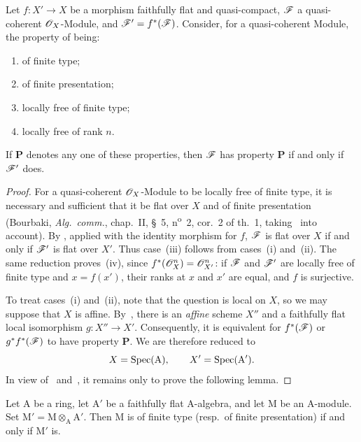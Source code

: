 \begin{proposition}[2.5.2]
\label{IV.2.5.2}
Let $f:X'\to X$ be a morphism faithfully flat and quasi-compact,
$\mathscr{F}$ a quasi-coherent $\mathscr{O}_X$-Module, and
$\mathscr{F}'=f^*(\mathscr{F})$. Consider, for a quasi-coherent Module, the property
of being:
\begin{enumerate}
  \item[\textup{(i)}] of finite type;
  \item[\textup{(ii)}] of finite presentation;
  \item[\textup{(iii)}] locally free of finite type;
  \item[\textup{(iv)}] locally free of rank $n$.
\end{enumerate}
If $\boldsymbol{P}$ denotes any one of these properties, then $\mathscr{F}$ has
property $\boldsymbol{P}$ if and only if $\mathscr{F}'$ does.
\end{proposition}

\begin{proof}
For a quasi-coherent $\mathscr{O}_X$-Module to be locally free of finite type,
it is necessary and sufficient that it be flat over $X$ and of finite
presentation (Bourbaki, \emph{Alg.\ comm.}, chap.~II, \S~5, n\textsuperscript{o}~2,
cor.~2 of th.~1, taking~ into account). By
, applied with the identity morphism for $f$, $\mathscr{F}$ is
flat over $X$ if and only if $\mathscr{F}'$ is flat over $X'$. Thus case~(iii)
follows from cases~(i) and~(ii). The same reduction proves~(iv), since
$f^*(\mathscr{O}_X^n)=\mathscr{O}_{X'}^n$: if $\mathscr{F}$ and $\mathscr{F}'$ are locally
free of finite type and $x=f(x')$, their ranks at $x$ and $x'$ are equal,
and $f$ is surjective.


To treat cases~(i) and~(ii), note that the question is local on $X$, so we
may suppose that $X$ is affine. By~, there is an \emph{affine}
scheme $X''$ and a faithfully flat local isomorphism $g:X''\to X'$.
Consequently, it is equivalent for $f^*(\mathscr{F})$ or
$g^*f^*(\mathscr{F})$ to have property $\boldsymbol{P}$. We are therefore reduced
to
\[
  X=\operatorname{Spec}(\mathrm{A}),\qquad X'=\operatorname{Spec}(\mathrm{A}').
\]
In view of~ and~, it remains only to
prove the following lemma.
\end{proof}

\begin{lemma}[2.5.3]
\label{IV.2.5.3}
Let $\mathrm{A}$ be a ring, let $\mathrm{A}'$ be a faithfully flat
$\mathrm{A}$-algebra, and let $\mathrm{M}$ be an $\mathrm{A}$-module.
Set $\mathrm{M}'=\mathrm{M}\otimes_{\mathrm{A}}\mathrm{A}'$. Then
$\mathrm{M}$ is of finite type \textup{(resp.}\ of finite
presentation\textnormal{)} if and only if $\mathrm{M}'$ is.
\end{lemma}

